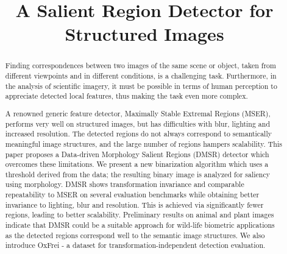 \documentclass[conference,compsoc]{IEEEtran}
\begin{document}
%
\title{A Salient Region Detector for Structured Images}


\author{
}

\maketitle

\begin{abstract}
Finding correspondences between two images of the same scene or object, taken from different viewpoints and in different conditions, is a challenging task. Furthermore, in the analysis of scientific imagery, it must be possible in terms of human perception to appreciate detected local features, thus making the task even more complex.

A renowned generic feature detector, Maximally Stable Extremal Regions (MSER), performs very well on structured images, but has difficulties with blur, lighting and increased resolution. The detected regions do not always correspond to semantically meaningful image structures, and the large number of regions hampers scalability. This paper proposes a Data-driven Morphology Salient Regions (DMSR) detector which overcomes these limitations. We present a new binarization algorithm which uses a threshold derived from the data; the resulting binary image is analyzed for saliency using morphology. DMSR shows transformation invariance and comparable repeatability to MSER on several evaluation benchmarks while obtaining better invariance to lighting, blur and resolution. This is achieved via significantly fewer regions, leading to better scalability. Preliminary results on animal and plant images indicate that DMSR could %
be a suitable approach for wild-life biometric applications as the detected regions correspond well to the semantic %
image structures. We also introduce OxFrei - a dataset for transformation-independent detection evaluation. 

\end{abstract}
\end{document}
